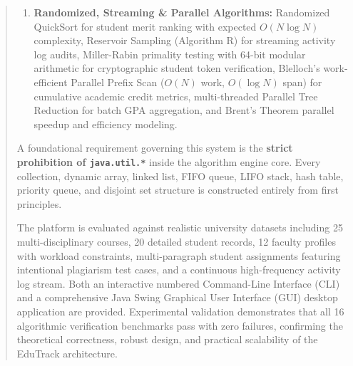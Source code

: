 \begin{abstract}
\begin{enumerate}
    \item \textbf{Randomized, Streaming \& Parallel Algorithms:} Randomized QuickSort for student merit ranking with expected $O(N \log N)$ complexity, Reservoir Sampling (Algorithm R) for streaming activity log audits, Miller-Rabin primality testing with 64-bit modular arithmetic for cryptographic student token verification, Blelloch's work-efficient Parallel Prefix Scan ($O(N)$ work, $O(\log N)$ span) for cumulative academic credit metrics, multi-threaded Parallel Tree Reduction for batch GPA aggregation, and Brent's Theorem parallel speedup and efficiency modeling.
\end{enumerate}

A foundational requirement governing this system is the \textbf{strict prohibition of \texttt{java.util.*}} inside the algorithm engine core. Every collection, dynamic array, linked list, FIFO queue, LIFO stack, hash table, priority queue, and disjoint set structure is constructed entirely from first principles.

The platform is evaluated against realistic university datasets including 25 multi-disciplinary courses, 20 detailed student records, 12 faculty profiles with workload constraints, multi-paragraph student assignments featuring intentional plagiarism test cases, and a continuous high-frequency activity log stream. Both an interactive numbered Command-Line Interface (CLI) and a comprehensive Java Swing Graphical User Interface (GUI) desktop application are provided. Experimental validation demonstrates that all 16 algorithmic verification benchmarks pass with zero failures, confirming the theoretical correctness, robust design, and practical scalability of the EduTrack architecture.
\end{abstract}
\newpage
